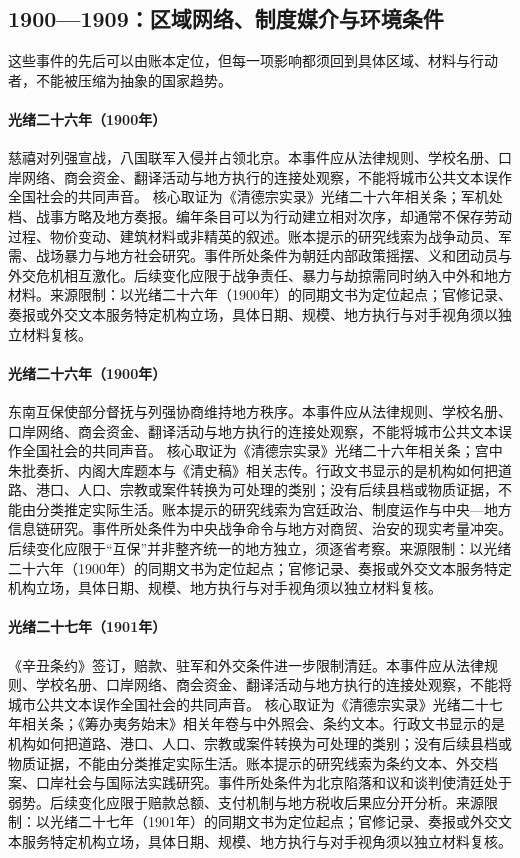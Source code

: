 \subsection{1900—1909：区域网络、制度媒介与环境条件}
这些事件的先后可以由账本定位，但每一项影响都须回到具体区域、材料与行动者，不能被压缩为抽象的国家趋势。
\hypertarget{civic:EQ-1900-BOXER-WAR}{}\paragraph{光绪二十六年（1900年）}慈禧对列强宣战，八国联军入侵并占领北京。本事件应从法律规则、学校名册、口岸网络、商会资金、翻译活动与地方执行的连接处观察，不能将城市公共文本误作全国社会的共同声音。 核心取证为《清德宗实录》光绪二十六年相关条；军机处档、战事方略及地方奏报。编年条目可以为行动建立相对次序，却通常不保存劳动过程、物价变动、建筑材料或非精英的叙述。账本提示的研究线索为战争动员、军需、战场暴力与地方社会研究。事件所处条件为朝廷内部政策摇摆、义和团动员与外交危机相互激化。后续变化应限于战争责任、暴力与劫掠需同时纳入中外和地方材料。来源限制：以光绪二十六年（1900年）的同期文书为定位起点；官修记录、奏报或外交文本服务特定机构立场，具体日期、规模、地方执行与对手视角须以独立材料复核。
\hypertarget{civic:EQ-1900-SOUTHEAST-MUTUAL-PROTECTION}{}\paragraph{光绪二十六年（1900年）}东南互保使部分督抚与列强协商维持地方秩序。本事件应从法律规则、学校名册、口岸网络、商会资金、翻译活动与地方执行的连接处观察，不能将城市公共文本误作全国社会的共同声音。 核心取证为《清德宗实录》光绪二十六年相关条；宫中朱批奏折、内阁大库题本与《清史稿》相关志传。行政文书显示的是机构如何把道路、港口、人口、宗教或案件转换为可处理的类别；没有后续县档或物质证据，不能由分类推定实际生活。账本提示的研究线索为宫廷政治、制度运作与中央—地方信息链研究。事件所处条件为中央战争命令与地方对商贸、治安的现实考量冲突。后续变化应限于“互保”并非整齐统一的地方独立，须逐省考察。来源限制：以光绪二十六年（1900年）的同期文书为定位起点；官修记录、奏报或外交文本服务特定机构立场，具体日期、规模、地方执行与对手视角须以独立材料复核。
\hypertarget{civic:EQ-1901-BOXER-PROTOCOL}{}\paragraph{光绪二十七年（1901年）}《辛丑条约》签订，赔款、驻军和外交条件进一步限制清廷。本事件应从法律规则、学校名册、口岸网络、商会资金、翻译活动与地方执行的连接处观察，不能将城市公共文本误作全国社会的共同声音。 核心取证为《清德宗实录》光绪二十七年相关条；《筹办夷务始末》相关年卷与中外照会、条约文本。行政文书显示的是机构如何把道路、港口、人口、宗教或案件转换为可处理的类别；没有后续县档或物质证据，不能由分类推定实际生活。账本提示的研究线索为条约文本、外交档案、口岸社会与国际法实践研究。事件所处条件为北京陷落和议和谈判使清廷处于弱势。后续变化应限于赔款总额、支付机制与地方税收后果应分开分析。来源限制：以光绪二十七年（1901年）的同期文书为定位起点；官修记录、奏报或外交文本服务特定机构立场，具体日期、规模、地方执行与对手视角须以独立材料复核。
